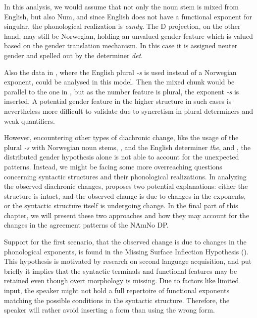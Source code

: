 \documentclass[output=paper]{langscibook}
\begin{document}
In this analysis, we would assume that not only the noun stem is mixed from English, but also Num, and since English does not have a functional exponent for singular, the phonological realization is \textit{candy}. The D projection, on the other hand, may still be Norwegian, holding an unvalued gender feature which is valued based on the gender translation mechanism. In this case it is assigned neuter gender and spelled out by the determiner \textit{det}. 



Also the data in , where the English plural \textit{{}-s} is used instead of a Norwegian exponent, could be analysed in this model. Then the mixed chunk would be parallel to the one in , but as the number feature is plural, the exponent \textit{{}-s} is inserted. A potential gender feature in the higher structure in such cases is nevertheless more difficult to validate due to syncretism in plural determiners and weak quantifiers. 



However, encountering other types of diachronic change, like the usage of the plural \textit{{}-s} with Norwegian noun stems, , and the English determiner \textit{the},  and , the distributed gender hypothesis alone is not able to account for the unexpected patterns. Instead, we might be facing some more overreaching questions concerning syntactic structures and their phonological realizations. In analyzing the observed diachronic changes, \citet{Riksem2017} proposes two potential explanations: either the structure is intact, and the observed change is due to changes in the exponents, or the syntactic structure itself is undergoing change. In the final part of this chapter, we will present these two approaches and how they may account for the changes in the agreement patterns of the NAmNo DP.



Support for the first scenario, that the observed change is due to changes in the phonological exponents, is found in the Missing Surface Inflection Hypothesis (\citealt{Lardiere2000, PrévostWhite2000}). This hypothesis is motivated by research on second language acquisition, and put briefly it implies that the syntactic terminals and functional features may be retained even though overt morphology is missing. Due to factors like limited input, the speaker might not hold a full repertoire of functional exponents matching the possible conditions in the syntactic structure. Therefore, the speaker will rather avoid inserting a form than using the wrong form. 
\end{document}
